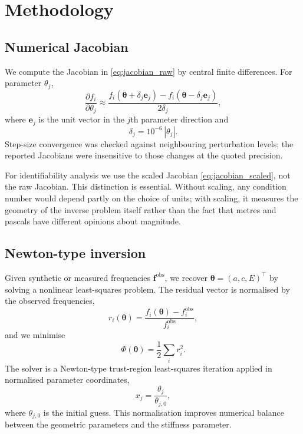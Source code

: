 \section{Methodology}\label{sec:methodology}

\subsection{Numerical Jacobian}

We compute the Jacobian in \eqref{eq:jacobian_raw} by central finite
differences.  For parameter $\theta_j$,
\begin{equation}\label{eq:fd}
  \frac{\partial f_i}{\partial \theta_j}
  \approx
  \frac{f_i(\boldsymbol{\theta}+\delta_j\mathbf{e}_j)
       -f_i(\boldsymbol{\theta}-\delta_j\mathbf{e}_j)}
       {2\delta_j},
\end{equation}
where $\mathbf{e}_j$ is the unit vector in the $j$th parameter direction and
\begin{equation}
  \delta_j = 10^{-6}\,|\theta_j|.
\end{equation}
Step-size convergence was checked against neighbouring perturbation levels; the
reported Jacobians were insensitive to those changes at the quoted precision.

For identifiability analysis we use the scaled Jacobian
\eqref{eq:jacobian_scaled}, not the raw Jacobian.  This distinction is
essential.  Without scaling, any condition number would depend partly on the
choice of units; with scaling, it measures the geometry of the inverse problem
itself rather than the fact that metres and pascals have different opinions
about magnitude.

\subsection{Newton-type inversion}

Given synthetic or measured frequencies $\mathbf{f}^\mathrm{obs}$, we recover
$\boldsymbol{\theta}=(a,c,E)^\top$ by solving a nonlinear least-squares
problem.  The residual vector is normalised by the observed frequencies,
\begin{equation}\label{eq:residual}
  r_i(\boldsymbol{\theta})
  =
  \frac{f_i(\boldsymbol{\theta})-f_i^\mathrm{obs}}
       {f_i^\mathrm{obs}},
\end{equation}
and we minimise
\begin{equation}\label{eq:cost}
  \Phi(\boldsymbol{\theta})
  =
  \frac{1}{2}\sum_i r_i^2.
\end{equation}
The solver is a Newton-type trust-region least-squares iteration applied in
normalised parameter coordinates,
\begin{equation}
  x_j = \frac{\theta_j}{\theta_{j,0}},
\end{equation}
where $\theta_{j,0}$ is the initial guess.  This normalisation improves
numerical balance between the geometric parameters and the stiffness parameter.

